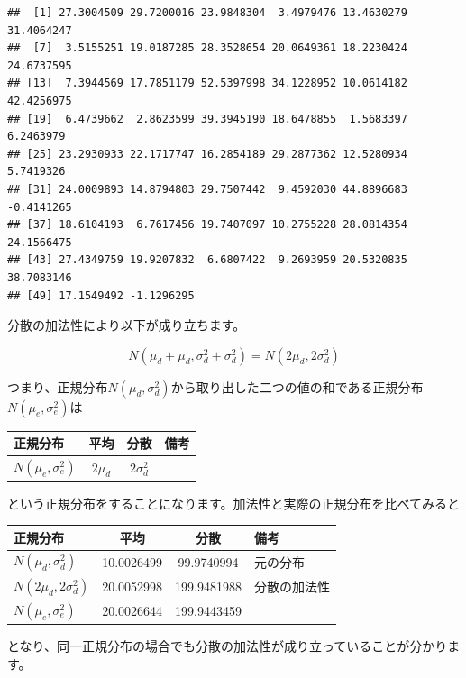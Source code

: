 \documentclass[]{tufte-handout}
\begin{document}
\begin{verbatim}
##  [1] 27.3004509 29.7200016 23.9848304  3.4979476 13.4630279 31.4064247
##  [7]  3.5155251 19.0187285 28.3528654 20.0649361 18.2230424 24.6737595
## [13]  7.3944569 17.7851179 52.5397998 34.1228952 10.0614182 42.4256975
## [19]  6.4739662  2.8623599 39.3945190 18.6478855  1.5683397  6.2463979
## [25] 23.2930933 22.1717747 16.2854189 29.2877362 12.5280934  5.7419326
## [31] 24.0009893 14.8794803 29.7507442  9.4592030 44.8896683 -0.4141265
## [37] 18.6104193  6.7617456 19.7407097 10.2755228 28.0814354 24.1566475
## [43] 27.4349759 19.9207832  6.6807422  9.2693959 20.5320835 38.7083146
## [49] 17.1549492 -1.1296295
\end{verbatim}

\newpage

分散の加法性により以下が成り立ちます。

\[N(\mu_d + \mu_d, \sigma^2_d + \sigma^2_d) = N(2\mu_d, 2\sigma^2_d)\]

つまり、正規分布\(N(\mu_d, \sigma^2_d)\)から取り出した二つの値の和である正規分布\(N(\mu_e, \sigma^2_e)\)は

\begin{longtable}[]{@{}lccl@{}}
\toprule
正規分布 & 平均 & 分散 & 備考 \\
\midrule
\endhead
\(N(\mu_e, \sigma^2_e)\) & \(2 \mu_d\) & \(2 \sigma^2_d\) & \\
\bottomrule
\end{longtable}

という正規分布をすることになります。加法性と実際の正規分布を比べてみると

\begin{longtable}[]{@{}lccl@{}}
\toprule
正規分布 & 平均 & 分散 & 備考 \\
\midrule
\endhead
\(N(\mu_d, \sigma^2_d)\) & 10.0026499 & 99.9740994 & 元の分布 \\
\(N(2\mu_d, 2\sigma^2_d)\) & 20.0052998 & 199.9481988 & 分散の加法性 \\
\(N(\mu_e, \sigma^2_e)\) & 20.0026644 & 199.9443459 & \\
\bottomrule
\end{longtable}

となり、同一正規分布の場合でも分散の加法性が成り立っていることが分かります。
\end{document}
